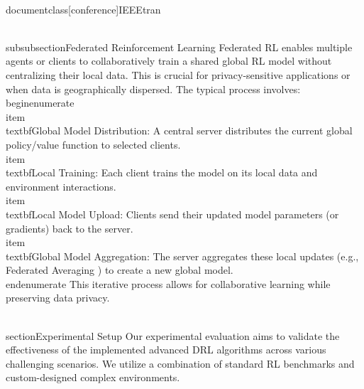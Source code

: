 \\documentclass[conference]{IEEEtran}
\begin{document}
\\subsubsection{Federated Reinforcement Learning}
Federated RL enables multiple agents or clients to collaboratively train a shared global RL model without centralizing their local data. This is crucial for privacy-sensitive applications or when data is geographically dispersed.
The typical process involves:
\\begin{enumerate}
    \\item \\textbf{Global Model Distribution:} A central server distributes the current global policy/value function to selected clients.
    \\item \\textbf{Local Training:} Each client trains the model on its local data and environment interactions.
    \\item \\textbf{Local Model Upload:} Clients send their updated model parameters (or gradients) back to the server.
    \\item \\textbf{Global Model Aggregation:} The server aggregates these local updates (e.g., Federated Averaging \cite{mcmahan2017communication}) to create a new global model.
\\end{enumerate}
This iterative process allows for collaborative learning while preserving data privacy.

\\section{Experimental Setup}
Our experimental evaluation aims to validate the effectiveness of the implemented advanced DRL algorithms across various challenging scenarios. We utilize a combination of standard RL benchmarks and custom-designed complex environments.
\end{document}
